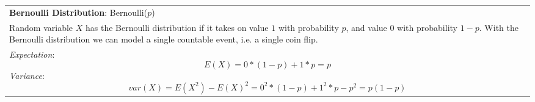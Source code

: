 {\tabulinesep=1mm
\begin{tabu}{|p{16cm} |}
\hline
\textbf{Bernoulli Distribution}: Bernoulli($p$) \\

Random variable $X$ has the Bernoulli distribution if it takes on value $1$ with probability $p$, and value $0$ with probability $1-p$. With the Bernoulli distribution we can model a single countable event, i.e. a single coin flip.
\\
\textit{Expectation}:
$$E(X) = 0*(1-p) + 1*p = p$$
\textit{Variance}:
$$var(X) = E(X^2) - E(X)^2 = 0^2 * (1-p) + 1^2 * p - p^2 = p(1-p)$$
\\
\hline
\end{tabu}
}